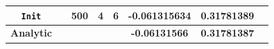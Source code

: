 \begin{tabular*}{\textwidth}{@{\extracolsep\fill}cccccccc@{}}
  \texttt{Init}   &  \Spherical{} &  500   & 4 &     6 & -0.061315634  &          0.31781389 \\
\midrule                                   
\textbf{Analytic} &                &        &   &&\textbf{-0.06131566}  &  \textbf{0.31781387} \\

\end{tabular*}

